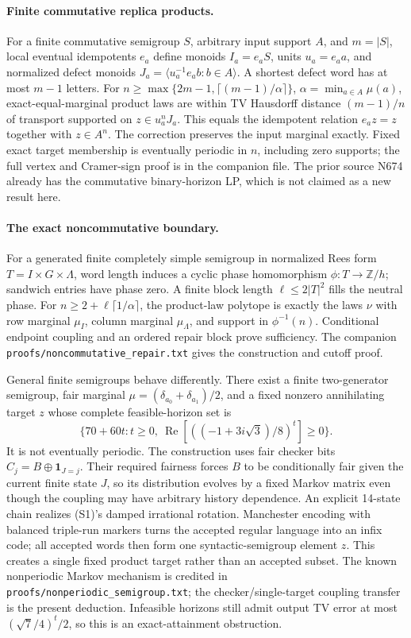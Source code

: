 \documentclass[11pt]{article}
\begin{document}
\paragraph{Finite commutative replica products.}
For a finite commutative semigroup $S$, arbitrary input support $A$, and $m=|S|$, local eventual idempotents $e_a$ define monoids $I_a=e_aS$, units $u_a=e_aa$, and normalized defect monoids $J_a=\langle u_a^{-1}e_ab:b\in A\rangle$. A shortest defect word has at most $m-1$ letters. For $n\ge\max\{2m-1,\lceil(m-1)/\alpha\rceil\}$, $\alpha=\min_{a\in A}\mu(a)$, exact-equal-marginal product laws are within TV Hausdorff distance $(m-1)/n$ of transport supported on $z\in u_a^nJ_a$. This equals the idempotent relation $e_az=z$ together with $z\in A^n$. The correction preserves the input marginal exactly. Fixed exact target membership is eventually periodic in $n$, including zero supports; the full vertex and Cramer-sign proof is in the companion file. The prior source N674 already has the commutative binary-horizon LP, which is not claimed as a new result here.

\paragraph{The exact noncommutative boundary.}
For a generated finite completely simple semigroup in normalized Rees form $T=I\times G\times\Lambda$, word length induces a cyclic phase homomorphism $\phi:T\to\mathbb Z/h$; sandwich entries have phase zero. A finite block length $\ell\le2|T|^2$ fills the neutral phase. For $n\ge2+\ell\lceil1/\alpha\rceil$, the product-law polytope is exactly the laws $\nu$ with row marginal $\mu_I$, column marginal $\mu_\Lambda$, and support in $\phi^{-1}(n)$. Conditional endpoint coupling and an ordered repair block prove sufficiency. The companion \texttt{proofs/noncommutative\_repair.txt} gives the construction and cutoff proof.

General finite semigroups behave differently. There exist a finite two-generator semigroup, fair marginal $\mu=(\delta_{a_0}+\delta_{a_1})/2$, and a fixed nonzero annihilating target $z$ whose complete feasible-horizon set is
\[
\{70+60t:t\ge0,\ \operatorname{Re}[((-1+3i\sqrt3)/8)^t]\ge0\}.
\tag{S1}
\]
It is not eventually periodic. The construction uses fair checker bits $C_j=B\mathbin\oplus\mathbf1_{J=j}$. Their required fairness forces $B$ to be conditionally fair given the current finite state $J$, so its distribution evolves by a fixed Markov matrix even though the coupling may have arbitrary history dependence. An explicit 14-state chain realizes (S1)'s damped irrational rotation. Manchester encoding with balanced triple-run markers turns the accepted regular language into an infix code; all accepted words then form one syntactic-semigroup element $z$. This creates a single fixed product target rather than an accepted subset. The known nonperiodic Markov mechanism is credited in \texttt{proofs/nonperiodic\_semigroup.txt}; the checker/single-target coupling transfer is the present deduction. Infeasible horizons still admit output TV error at most $(\sqrt7/4)^t/2$, so this is an exact-attainment obstruction.
\end{document}
